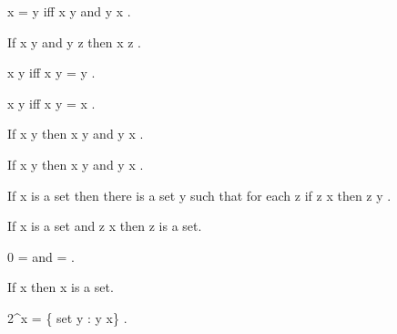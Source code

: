 \documentclass[a4paper,draft]{amsproc}
\begin{document}
\begin{forthel}
\begin{theorem}
 x = y  iff  x \subset y  and  y \subset x .
\end{theorem}

\begin{theorem}
If  x \subset y  and  y \subset z  then  x \subset z .
\end{theorem}

\begin{theorem}
 x \subset y  iff  x \cup y = y .
\end{theorem}

\begin{theorem}
 x \subset y  iff  x \cap y = x .
\end{theorem}

\begin{theorem}
If  x \subset y  then  \bigcup x \subset \bigcup y 
and  \bigcap y \subset \bigcap x .
\end{theorem}

\begin{theorem}
If  x \in y  then  x \subset \bigcup y  
and  \bigcap y \subset x .
\end{theorem}


\begin{axiom}
If  x  is a set then there is a set  y  such that for each
 z  if  z \subset x  then  z \in y .
\end{axiom}


\begin{theorem}
If  x  is a set and  z \subset x  then  z  is a set.
\end{theorem}

\begin{theorem}
 0 = \bigcap {}  and   = \bigcup {} .
\end{theorem}

\begin{theorem}
If  x   then  \bigcap x  is a set.
\end{theorem}

\begin{definition}  2^{x} = \{ set  y : y \subset x\} .\end{definition}


\end{forthel}
\end{document}
